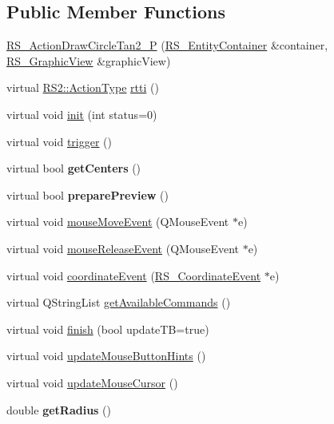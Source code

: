 \subsection*{Public Member Functions}
\begin{DoxyCompactItemize}
\item 
\hyperlink{classRS__ActionDrawCircleTan2__1P_a1e0d8f19e933c5ad369b0fa64d9b60cd}{R\-S\-\_\-\-Action\-Draw\-Circle\-Tan2\-\_\-P} (\hyperlink{classRS__EntityContainer}{R\-S\-\_\-\-Entity\-Container} \&container, \hyperlink{classRS__GraphicView}{R\-S\-\_\-\-Graphic\-View} \&graphic\-View)
\item 
virtual \hyperlink{classRS2_afe3523e0bc41fd637b892321cfc4b9d7}{R\-S2\-::\-Action\-Type} \hyperlink{classRS__ActionDrawCircleTan2__1P_a54ff894ad8f658a79bf12021cc2d087d}{rtti} ()
\item 
virtual void \hyperlink{classRS__ActionDrawCircleTan2__1P_a00b5f96870cc4f400524f4565b08c318}{init} (int status=0)
\item 
virtual void \hyperlink{classRS__ActionDrawCircleTan2__1P_a424b9cc5920da4db3b5f402705a442ae}{trigger} ()
\item 
\hypertarget{classRS__ActionDrawCircleTan2__1P_a337699673258baf06982e5cff97e4d47}{virtual bool {\bfseries get\-Centers} ()}\label{classRS__ActionDrawCircleTan2__1P_a337699673258baf06982e5cff97e4d47}

\item 
\hypertarget{classRS__ActionDrawCircleTan2__1P_a14f03c34402323c47eb5400600e21f71}{virtual bool {\bfseries prepare\-Preview} ()}\label{classRS__ActionDrawCircleTan2__1P_a14f03c34402323c47eb5400600e21f71}

\item 
virtual void \hyperlink{classRS__ActionDrawCircleTan2__1P_aeb502a7d4ba888679541a2000a30122a}{mouse\-Move\-Event} (Q\-Mouse\-Event $\ast$e)
\item 
virtual void \hyperlink{classRS__ActionDrawCircleTan2__1P_a11ae7a3501a1e33fd2a2297cb9574921}{mouse\-Release\-Event} (Q\-Mouse\-Event $\ast$e)
\item 
virtual void \hyperlink{classRS__ActionDrawCircleTan2__1P_a47d2b2cd2c9478fc8befd0c5993da7a5}{coordinate\-Event} (\hyperlink{classRS__CoordinateEvent}{R\-S\-\_\-\-Coordinate\-Event} $\ast$e)
\item 
virtual Q\-String\-List \hyperlink{classRS__ActionDrawCircleTan2__1P_adcfd6fa8ebd42310615d3b5937f2353d}{get\-Available\-Commands} ()
\item 
virtual void \hyperlink{classRS__ActionDrawCircleTan2__1P_adaa2aa1eca1b66af33c50241775408d1}{finish} (bool update\-T\-B=true)
\item 
virtual void \hyperlink{classRS__ActionDrawCircleTan2__1P_a0b354a10dfb5027326d5afae6d25bff0}{update\-Mouse\-Button\-Hints} ()
\item 
virtual void \hyperlink{classRS__ActionDrawCircleTan2__1P_a86afb698813d46610939c6b06e642d3f}{update\-Mouse\-Cursor} ()
\item 
\hypertarget{classRS__ActionDrawCircleTan2__1P_af708c31b7c673d2d1fa370065c946839}{double {\bfseries get\-Radius} ()}\label{classRS__ActionDrawCircleTan2__1P_af708c31b7c673d2d1fa370065c946839}

\end{DoxyCompactItemize}
